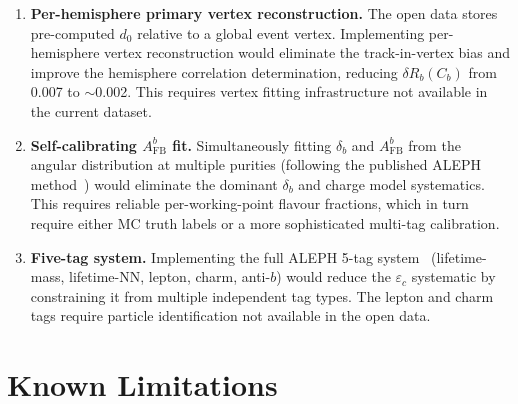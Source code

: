 \documentclass[11pt,a4paper]{article}
\begin{document}
\begin{enumerate}
\item \textbf{Per-hemisphere primary vertex reconstruction.}
  The open data stores pre-computed $d_0$ relative to a global event
  vertex.  Implementing per-hemisphere vertex reconstruction would
  eliminate the track-in-vertex bias and improve the hemisphere
  correlation determination, reducing $\delta R_b(C_b)$ from 0.007
  to $\sim$0.002.  This requires vertex fitting infrastructure not
  available in the current dataset.

\item \textbf{Self-calibrating $A_\mathrm{FB}^b$ fit.}
  Simultaneously fitting $\delta_b$ and $A_\mathrm{FB}^b$ from the
  angular distribution at multiple purities (following the published
  ALEPH method~\cite{ALEPH:AFBb}) would eliminate the dominant
  $\delta_b$ and charge model systematics.  This requires reliable
  per-working-point flavour fractions, which in turn require either
  MC truth labels or a more sophisticated multi-tag calibration.

\item \textbf{Five-tag system.}
  Implementing the full ALEPH 5-tag system~\cite{ALEPH:Rb:1996}
  (lifetime-mass, lifetime-NN, lepton, charm, anti-$b$) would reduce
  the $\varepsilon_c$ systematic by constraining it from multiple
  independent tag types.  The lepton and charm tags require particle
  identification not available in the open data.
\end{enumerate}

\section{Known Limitations}
\label{sec:limitations}
\end{document}
